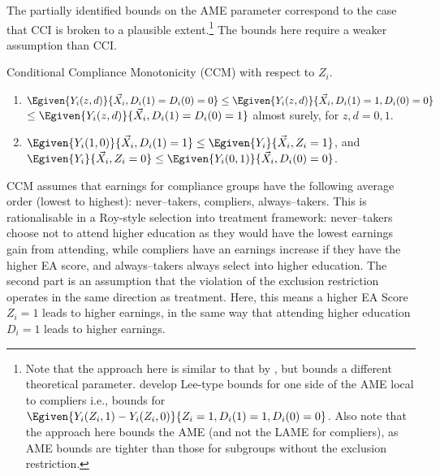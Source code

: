 The partially identified bounds on the AME parameter correspond to the case that CCI is broken to a plausible extent.\footnote{
    Note that the approach here is similar to that by \cite{flores2013partial}, but bounds a different theoretical parameter.
    \cite{flores2013partial} develop Lee-type bounds for one side of the AME local to compliers i.e., bounds for $\Egiven{Y_i(Z_i, 1) - Y_i(Z_i, 0)}{Z_i =1, D_i(1)=1, D_i(0) = 0}$.
    Also note that the approach here bounds the AME (and not the LAME for compliers), as AME bounds are tighter than those for subgroups without the exclusion restriction.
}
The bounds here require a weaker assumption than CCI.
\begin{assumption}
    \label{assumption:compliance-monotonicity}
    Conditional Compliance Monotonicity (CCM) with respect to $Z_i$.
    \begin{enumerate}
        \item \label{assumption:compliance-monotonicity-POs}
        $\Egiven{Y_i(z, d)}{\vec X_i, D_i(1) = D_i(0) = 0}
        \leq \Egiven{Y_i(z, d)}{\vec X_i, D_i(1) = 1, D_i(0) = 0}$ \\
        $\leq \Egiven{Y_i(z, d)}{\vec X_i, D_i(1) = D_i(0) = 1}$
        almost surely, for $z, d = 0, 1$.
        \item \label{assumption:compliance-monotonicity-z}
        $\Egiven{Y_i(1,0)}{\vec X_i, D_i(1) = 1}
        \leq \Egiven{Y_i}{\vec X_i, Z_i = 1}$, and
        $\Egiven{Y_i}{\vec X_i, Z_i = 0}
        \leq \Egiven{Y_i(0,1)}{\vec X_i, D_i(0) = 0}$.
    \end{enumerate}
\end{assumption}
CCM assumes that earnings for compliance groups have the following average order (lowest to highest): never--takers, compliers, always--takers.
This is rationalisable in a Roy-style selection into treatment framework:
never--takers choose not to attend higher education as they would have the lowest earnings gain from attending, while compliers have an earnings increase if they have the higher EA score, and always--takers always select into higher education.
The second part is an assumption that the violation of the exclusion restriction operates in the same direction as treatment.
Here, this means a higher EA Score $Z_i = 1$ leads to higher earnings, in the same way that attending higher education $D_i = 1$ leads to higher earnings.

